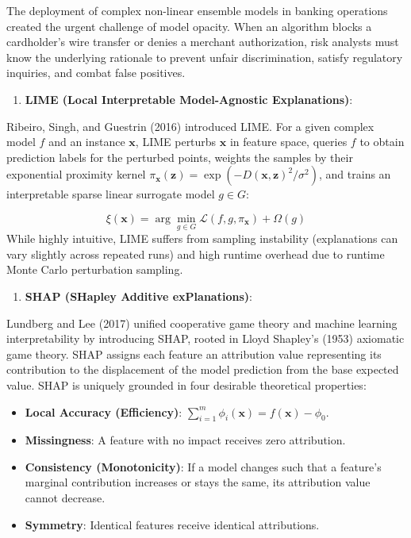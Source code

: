 \documentclass[12pt,a4paper,oneside]{report}
\begin{document}
The deployment of complex non-linear ensemble models in banking operations created the urgent challenge of model opacity. When an algorithm blocks a cardholder's wire transfer or denies a merchant authorization, risk analysts must know the underlying rationale to prevent unfair discrimination, satisfy regulatory inquiries, and combat false positives.


\begin{enumerate}[leftmargin=0.35in]
\item \textbf{LIME (Local Interpretable Model-Agnostic Explanations)}:
\end{enumerate}
Ribeiro, Singh, and Guestrin (2016) introduced LIME. For a given complex model $f$ and an instance $\mathbf{x}$, LIME perturbs $\mathbf{x}$ in feature space, queries $f$ to obtain prediction labels for the perturbed points, weights the samples by their exponential proximity kernel $\pi_{\mathbf{x}}(\mathbf{z}) = \exp(-D(\mathbf{x}, \mathbf{z})^2 / \sigma^2)$, and trains an interpretable sparse linear surrogate model $g \in G$:

\begin{equation}
\xi(\mathbf{x}) = \arg\min_{g \in G} \mathcal{L}(f, g, \pi_{\mathbf{x}}) + \Omega(g)
\end{equation}
While highly intuitive, LIME suffers from sampling instability (explanations can vary slightly across repeated runs) and high runtime overhead due to runtime Monte Carlo perturbation sampling.


\begin{enumerate}[leftmargin=0.35in]
\item \textbf{SHAP (SHapley Additive exPlanations)}:
\end{enumerate}
Lundberg and Lee (2017) unified cooperative game theory and machine learning interpretability by introducing SHAP, rooted in Lloyd Shapley's (1953) axiomatic game theory. SHAP assigns each feature an attribution value representing its contribution to the displacement of the model prediction from the base expected value. SHAP is uniquely grounded in four desirable theoretical properties:

\begin{itemize}[leftmargin=0.35in]
\item \textbf{Local Accuracy (Efficiency)}: $\sum_{i=1}^m \phi_i(\mathbf{x}) = f(\mathbf{x}) - \phi_0$.
\item \textbf{Missingness}: A feature with no impact receives zero attribution.
\item \textbf{Consistency (Monotonicity)}: If a model changes such that a feature's marginal contribution increases or stays the same, its attribution value cannot decrease.
\item \textbf{Symmetry}: Identical features receive identical attributions.
\end{itemize}
\end{document}
